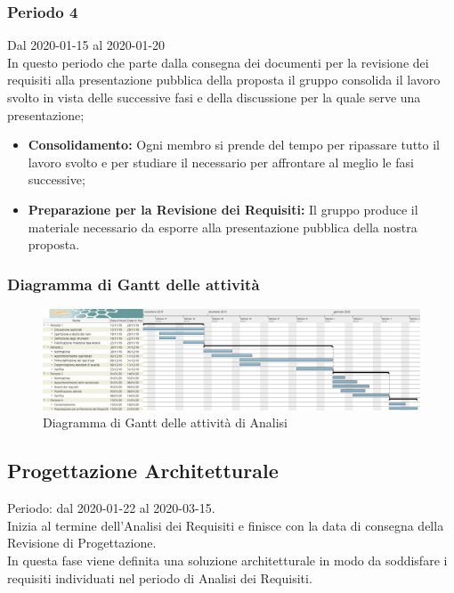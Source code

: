 \subsubsection{Periodo 4} 
Dal 2020-01-15 al 2020-01-20\\
In questo periodo che parte dalla consegna dei documenti per la revisione dei requisiti alla presentazione pubblica della proposta il gruppo consolida il lavoro svolto in vista delle successive fasi e della discussione per la quale serve una presentazione;
\begin{itemize}
	\item \textbf{Consolidamento:} Ogni membro si prende del tempo per ripassare tutto il lavoro svolto e per studiare il necessario per affrontare al meglio le fasi successive;
	\item \textbf{Preparazione per la Revisione dei Requisiti:} Il gruppo produce il materiale necessario da esporre alla presentazione pubblica della nostra proposta.
\end{itemize}

	\newpage
	\begin{landscape}
	\subsubsection{Diagramma di Gantt delle attività}
	\pagestyle{empty}
	\begin{figure}[h]
		\caption{Diagramma di Gantt delle attività di Analisi}
		\begin{center}	
			\includegraphics[scale=0.50]{sezioni/DiagrammiGantt/Analisi.png}
		\end{center}
		
	\end{figure}
	 \end{landscape}

\clearpage
\subsection{Progettazione Architetturale}
Periodo: dal 2020-01-22 al 2020-03-15.
\\Inizia al termine dell'Analisi dei Requisiti e finisce con la data di consegna della Revisione di Progettazione.
\\In questa fase viene definita una soluzione architetturale in modo da soddisfare i requisiti individuati nel periodo di Analisi dei Requisiti.

